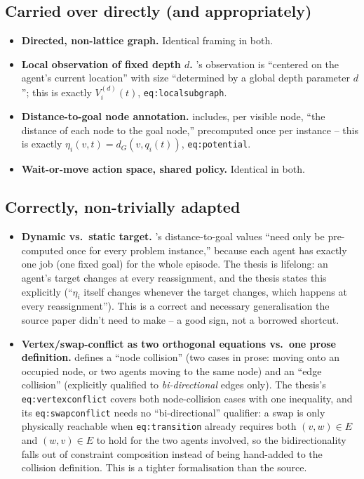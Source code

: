 \documentclass[11pt]{article}
\begin{document}
\subsection{Carried over directly (and appropriately)}
\begin{itemize}
  \item \textbf{Directed, non-lattice graph.} Identical framing in both.
  \item \textbf{Local observation of fixed depth $d$.}
    \citeauthor{knippenberg2021}'s observation is ``centered on the agent's
    current location'' with size ``determined by a global depth parameter
    $d$''; this is exactly $V_i^{(d)}(t)$, \texttt{eq:localsubgraph}.
  \item \textbf{Distance-to-goal node annotation.}
    \citeauthor{knippenberg2021} includes, per visible node, ``the distance
    of each node to the goal node,'' precomputed once per instance -- this
    is exactly $\eta_i(v,t) = d_G(v,q_i(t))$, \texttt{eq:potential}.
  \item \textbf{Wait-or-move action space, shared policy.} Identical in
    both.
\end{itemize}

\subsection{Correctly, non-trivially adapted}
\begin{itemize}
  \item \textbf{Dynamic vs.\ static target.} \citeauthor{knippenberg2021}'s
    distance-to-goal values ``need only be pre-computed once for every
    problem instance,'' because each agent has exactly one job (one fixed
    goal) for the whole episode. The thesis is lifelong: an agent's target
    changes at every reassignment, and the thesis states this explicitly
    (``$\eta_i$ itself changes whenever the target changes, which happens at
    every reassignment''). This is a correct and necessary generalisation
    the source paper didn't need to make -- a good sign, not a borrowed
    shortcut.
  \item \textbf{Vertex/swap-conflict as two orthogonal equations vs.\ one
    prose definition.} \citeauthor{knippenberg2021} defines a ``node
    collision'' (two cases in prose: moving onto an occupied node, or two
    agents moving to the same node) and an ``edge collision'' (explicitly
    qualified to \emph{bi-directional} edges only). The thesis's
    \texttt{eq:vertexconflict} covers both node-collision cases with one
    inequality, and its \texttt{eq:swapconflict} needs no ``bi-directional''
    qualifier: a swap is only physically reachable when
    \texttt{eq:transition} already requires both $(v,w)\in E$ and
    $(w,v)\in E$ to hold for the two agents involved, so the bidirectionality
    falls out of constraint composition instead of being hand-added to the
    collision definition. This is a tighter formalisation than the source.
\end{itemize}
\end{document}
